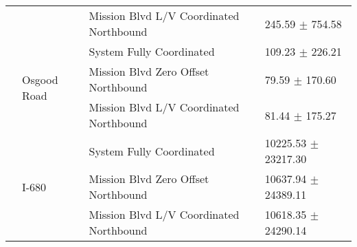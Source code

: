 \begin{tabular}{llll}
 &  & Mission Blvd L/V Coordinated Northbound & 245.59 $\pm$ 754.58 \\
 & \multirow[t]{3}{*}{Osgood Road} & System Fully Coordinated & 109.23 $\pm$ 226.21 \\
 &  & Mission Blvd Zero Offset Northbound & 79.59 $\pm$ 170.60 \\
 &  & Mission Blvd L/V Coordinated Northbound & 81.44 $\pm$ 175.27 \\
 & \multirow[t]{3}{*}{I-680} & System Fully Coordinated & 10225.53 $\pm$ 23217.30 \\
 &  & Mission Blvd Zero Offset Northbound & 10637.94 $\pm$ 24389.11 \\
 &  & Mission Blvd L/V Coordinated Northbound & 10618.35 $\pm$ 24290.14 \\
\bottomrule
\end{tabular}
